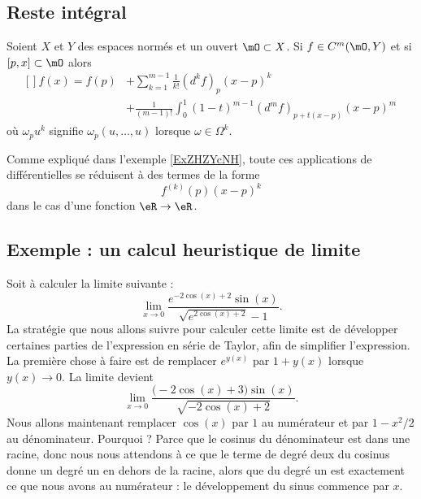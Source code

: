 \subsection{Reste intégral}

\begin{proposition}\label{PropAXaSClx}
    Soient \( X\) et \( Y\) des espaces normés et un ouvert \( \mO\subset X\). Si \( f\in C^m(\mO,Y)\) et si \( [p,x]\subset \mO\) alors
    \begin{equation}
        \begin{aligned}[]
            f(x)=f(p)&+\sum_{k=1}^{m-1}\frac{1}{ k! }(d^kf)_p (x-p)^k \\
            &+\frac{1}{ (m-1)! }\int_0^1(1-t)^{m-1}(d^mf)_{ p+t(x-p) }(x-p)^m \
        \end{aligned}
    \end{equation}
    où \( \omega_pu^k\) signifie \( \omega_p(u,\ldots, u)\) lorsque \( \omega\in \Omega^k\).
\end{proposition}
Comme expliqué dans l'exemple \ref{ExZHZYcNH}, toute ces applications de différentielles se réduisent à des termes de la forme
\begin{equation}
    f^{(k)}(p)(x-p)^k
\end{equation}
dans le cas d'une fonction \( \eR\to\eR\).

\subsection{Exemple : un calcul heuristique de limite}
\label{SubSecCalcLimHeuris}

Soit à calculer la limite suivante :
\begin{equation}
    \lim_{x\to 0} \frac{  e^{-2\cos(x)+2}\sin(x) }{ \sqrt{ e^{2\cos(x)+2}}-1 }.
\end{equation}
La stratégie que nous allons suivre pour calculer cette limite est de développer certaines parties de l'expression en série de Taylor, afin de simplifier l'expression. La première chose à faire est de remplacer $ e^{y(x)}$ par $1+y(x)$ lorsque $y(x)\to 0$. La limite devient
\begin{equation}
    \lim_{x\to 0} \frac{ \big( -2\cos(x)+3 \big)\sin(x) }{ \sqrt{-2\cos(x)+2} }.
\end{equation}
Nous allons maintenant remplacer $\cos(x)$ par $1$ au numérateur et par $1-x^2/2$ au dénominateur. Pourquoi ? Parce que le cosinus du dénominateur est dans une racine, donc nous nous attendons à ce que le terme de degré deux du cosinus donne un degré un en dehors de la racine, alors que du degré un est exactement ce que nous avons au numérateur : le développement du sinus commence par $x$.

